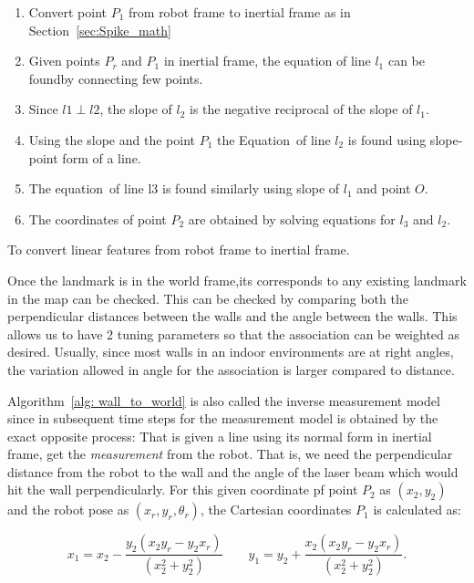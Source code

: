 \begin{algorithm}[]
	\begin{enumerate}
		\item Convert point $ P_1 $ from robot frame to inertial frame as in Section~\ref{sec:Spike_math}
		\item Given points $ P_r $ and $ P_1 $ in inertial frame, the equation of line $ l_1 $ can be foundby connecting few points. 
		\item Since $ l1 \perp l2 $, the slope of $ l_2 $ is the negative reciprocal of the slope of $ l_1 $. 
		\item Using the slope and the point $ P_1 $ the Equation~of line $ l_2 $ is found using slope-point form of a line.
		\item The equation~of line l3 is found similarly using slope of $ l_1 $ and point $ O $. 
		\item The coordinates of point $ P_2 $ are obtained by solving equations for $ l_3 $ and $ l_2 $.
	\end{enumerate}
\caption{To convert linear features from robot frame to inertial frame.}
\label{alg: wall_to_world}
\end{algorithm}

Once the landmark is in the world frame,its corresponds to any existing landmark in the map can be checked. This can be checked by comparing both the perpendicular distances between the walls and the angle between the walls. This allows us to have 2 tuning parameters so that the association can be weighted as desired. Usually, since most walls in an indoor environments are at right angles, the variation allowed in angle for the association is larger compared to distance. 

Algorithm~\ref{alg: wall_to_world} is also called the inverse measurement model since in subsequent time steps for the measurement model is obtained by the exact opposite process: That is given a line using its normal form in inertial frame, get the \textit{measurement} from the robot. That is, we need the perpendicular distance from the robot to the wall and the angle of the laser beam which would hit the wall perpendicularly. For this given coordinate pf point $ P_2 $ as $ (x_2,y_2) $ and the robot pose as $ (x_r,y_r,\theta_r) $, the Cartesian coordinates $ P_1 $ is calculated as: %

\begin{equation}
	\label{eq:lineModel1}
	x_1 = x_2 - \frac{y_2 ( x_2 y_ r- y_2 x_r)}{(x_2^2 + y_2^2)}
	\qquad
	y_1 = y_2 + \frac{x_2 ( x_2 y_ r- y_2 x_r)}{(x_2^2 + y_2^2)}.
\end{equation}

